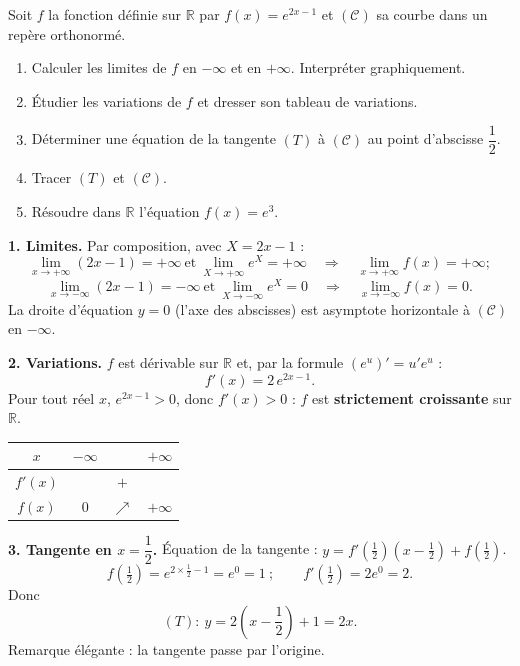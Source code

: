 \documentclass[11pt]{article}
\newcommand{\cle}[1]{{\popxbold\color{popdark}#1}}
\begin{document}
\begin{exoresolu}[Étude de $f(x)=e^{2x-1}$ (type Bac A)]
Soit $f$ la fonction définie sur $\mathbb{R}$ par $f(x)=e^{2x-1}$ et $(\mathcal{C})$ sa courbe dans un repère orthonormé.
\begin{enumerate}
\item Calculer les limites de $f$ en $-\infty$ et en $+\infty$. Interpréter graphiquement.
\item Étudier les variations de $f$ et dresser son tableau de variations.
\item Déterminer une équation de la tangente $(T)$ à $(\mathcal{C})$ au point d'abscisse $\dfrac{1}{2}$.
\item Tracer $(T)$ et $(\mathcal{C})$.
\item Résoudre dans $\mathbb{R}$ l'équation $f(x)=e^3$.
\end{enumerate}
\tcblower
\textbf{1. Limites.} Par composition, avec $X=2x-1$ :
\[
\lim_{x\to +\infty}(2x-1)=+\infty \ \text{et}\ \lim_{X\to+\infty}e^X=+\infty \quad\Longrightarrow\quad \lim_{x\to+\infty} f(x)=+\infty ;
\]
\[
\lim_{x\to -\infty}(2x-1)=-\infty \ \text{et}\ \lim_{X\to-\infty}e^X=0 \quad\Longrightarrow\quad \lim_{x\to-\infty} f(x)=0.
\]
La droite d'équation $y=0$ (l'axe des abscisses) est \cle{asymptote horizontale} à $(\mathcal{C})$ en $-\infty$.

\textbf{2. Variations.} $f$ est dérivable sur $\mathbb{R}$ et, par la formule $(e^u)'=u'e^u$ :
\[
f'(x)=2\,e^{2x-1}.
\]
Pour tout réel $x$, $e^{2x-1}>0$, donc $f'(x)>0$ : $f$ est \textbf{strictement croissante} sur $\mathbb{R}$.
\begin{center}
\begin{tabular}{|c|ccc|}
\hline
$x$ & $-\infty$ & & $+\infty$ \\
\hline
$f'(x)$ & & $+$ & \\
\hline
$f(x)$ & $0$ & $\nearrow$ & $+\infty$ \\
\hline
\end{tabular}
\end{center}

\textbf{3. Tangente en $x=\dfrac{1}{2}$.} Équation de la tangente : $y=f'\left(\tfrac12\right)\left(x-\tfrac12\right)+f\left(\tfrac12\right)$.
\[
f\left(\tfrac12\right)=e^{2\times\frac12-1}=e^0=1 \ ;\qquad f'\left(\tfrac12\right)=2e^0=2.
\]
Donc
\[
(T):\ y=2\left(x-\frac12\right)+1=2x.
\]
Remarque élégante : la tangente passe par l'origine.


\end{exoresolu}
\end{document}
